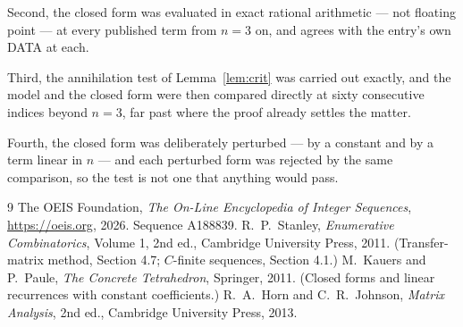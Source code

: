 \documentclass[11pt,a4paper]{article}
\theoremstyle{plain}
\theoremstyle{definition}
\begin{document}
Second, the closed form was evaluated in exact rational arithmetic --- not floating point ---
at every published term from $n=3$ on, and agrees with the entry's own DATA at each.

Third, the annihilation test of Lemma~\ref{lem:crit} was carried out exactly, and the model
and the closed form were then compared directly at sixty consecutive indices beyond
$n=3$, far past where the proof already settles the matter.

Fourth, the closed form was deliberately perturbed --- by a constant and by a term linear in
$n$ --- and each perturbed form was rejected by the same comparison, so the test is not one
that anything would pass.

\begin{thebibliography}{9}
 The OEIS Foundation, \emph{The On-Line Encyclopedia of Integer
Sequences}, \url{https://oeis.org}, 2026. Sequence A188839.
 R.~P.~Stanley, \emph{Enumerative Combinatorics}, Volume 1, 2nd ed.,
Cambridge University Press, 2011. (Transfer-matrix method, Section 4.7; $C$-finite sequences,
Section 4.1.)
 M.~Kauers and P.~Paule, \emph{The Concrete Tetrahedron}, Springer, 2011.
(Closed forms and linear recurrences with constant coefficients.)
 R.~A.~Horn and C.~R.~Johnson, \emph{Matrix Analysis}, 2nd ed., Cambridge
University Press, 2013.
\end{thebibliography}
\end{document}
